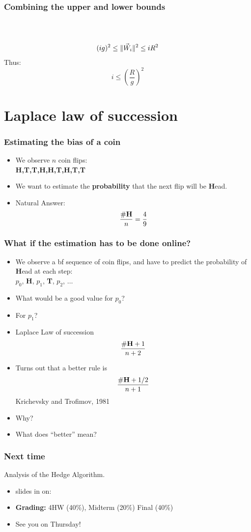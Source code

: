 \documentclass{beamer}
\begin{document}
\begin{frame}
\frametitle{Combining the upper and lower bounds}
~\\
~\\
\pause
$$(ig)^2 \leq \|\vec{W}_i\|^2 \leq i R^2$$
\pause
Thus:
$$ i \leq \left(\frac{R}{g} \right)^2 $$
\end{frame}

\section{Laplace law of succession}

\begin{frame}
\frametitle{Estimating the bias of a coin}

\begin{itemize}
\item We observe $n$ coin flips:\\
{\bf H,T,T,H,H,T,H,T,T}
\item
We want to estimate the {\bf probability} that the next flip will be {\bf H}ead.
\item
Natural Answer:
\[
\frac{\#\mbox{\bf H}}{n} = \frac{4}{9}
\]
\end{itemize}
\end{frame}

\begin{frame}
\frametitle{What if the estimation has to be done online?}

\begin{itemize}
\item We observe a {bf sequence} of coin flips, and have to predict the probability of {\bf H}ead at each step:
\\ $p_0$,\pause 
{\bf H},\pause 
$p_1$,\pause
{\bf T},\pause
$p_2$,\pause 
$\ldots$
\item
What would be a good value for $p_0$?
\item
For $p_1$?
\item
Laplace Law of succession
\[
\frac{\#\mbox{\bf H} +1}{n+2}
\]
\item 
Turns out that a better rule is 
\[
\frac{\#\mbox{\bf H} +1/2}{n+1}
\]
Krichevsky and Trofimov, 1981
\item
Why? 
\item 
What does ``better'' mean?
\end{itemize}
\end{frame}

\begin{frame}
\frametitle{Next time}
Analysis of the Hedge Algorithm.
\begin{itemize}
\item slides in  on: 
\item {\bf Grading:} 4HW (40\%), Midterm (20\%) Final (40\%)
\item See you on Thursday!
\end{itemize}
\end{frame}
\end{document}
